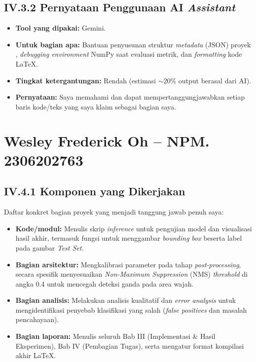 \documentclass[11pt,a4paper,oneside]{report}
\begin{document}
\subsection*{IV.3.2 Pernyataan Penggunaan AI \textit{Assistant}}
\begin{itemize}[leftmargin=*]
    \item \textbf{Tool yang dipakai:} Gemini.
    \item \textbf{Untuk bagian apa:} Bantuan penyusunan struktur \textit{metadata} (JSON) proyek , \textit{debugging environment} NumPy saat evaluasi metrik, dan \textit{formatting} kode LaTeX.
    \item \textbf{Tingkat ketergantungan:} Rendah (estimasi $\sim$20\% output berasal dari AI).
    \item \textbf{Pernyataan:} Saya memahami dan dapat mempertanggungjawabkan setiap baris kode/teks yang saya klaim sebagai bagian saya.
\end{itemize}

\section{Wesley Frederick Oh -- NPM. 2306202763}

\subsection*{IV.4.1 Komponen yang Dikerjakan}
Daftar konkret bagian proyek yang menjadi tanggung jawab penuh saya:
\begin{itemize}[leftmargin=*]
    \item \textbf{Kode/modul:} Menulis skrip \textit{inference} untuk pengujian model dan visualisasi hasil akhir, termasuk fungsi untuk menggambar \textit{bounding box} beserta label pada gambar \textit{Test Set}.
    \item \textbf{Bagian arsitektur:} Mengkalibrasi parameter pada tahap \textit{post-processing}, secara spesifik menyesuaikan \textit{Non-Maximum Suppression} (NMS) \textit{threshold} di angka 0.4 untuk mencegah deteksi ganda pada area wajah.
    \item \textbf{Bagian analisis:} Melakukan analisis kualitatif dan \textit{error analysis} untuk mengidentifikasi penyebab klasifikasi yang salah (\textit{false positives} dan masalah pencahayaan).
    \item \textbf{Bagian laporan:} Menulis seluruh Bab III (Implementasi \& Hasil Eksperimen), Bab IV (Pembagian Tugas), serta mengatur format kompilasi akhir LaTeX.
\end{itemize}
\end{document}
